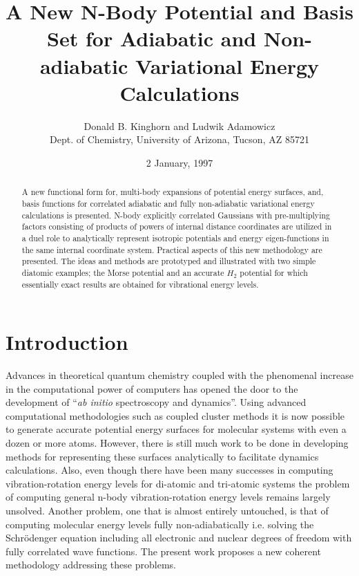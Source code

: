 \documentclass[12pt,thmsa]{article}
\begin{document}
\author{Donald B. Kinghorn and Ludwik Adamowicz \\
Dept. of Chemistry, University of Arizona, Tucson, AZ 85721}
\title{A New N-Body Potential and Basis Set for Adiabatic and Non-adiabatic
Variational Energy Calculations }
\date{2 January, 1997}
\maketitle

\begin{abstract}
A new functional form for, multi-body expansions of potential energy
surfaces, and, basis functions for correlated adiabatic and fully
non-adiabatic variational energy calculations is presented. N-body
explicitly correlated Gaussians with pre-multiplying factors consisting of
products of powers of internal distance coordinates are utilized in a duel
role to analytically represent isotropic potentials and energy
eigen-functions in the same internal coordinate system. Practical aspects of
this new methodology are presented. The ideas and methods are prototyped and
illustrated with two simple diatomic examples; the Morse potential and an
accurate $H_2$ potential for which essentially exact results are obtained
for vibrational energy levels.
\end{abstract}

\section{Introduction}

Advances in theoretical quantum chemistry coupled with the phenomenal
increase in the computational power of computers has opened the door to the
development of ``\emph{ab initio} spectroscopy and dynamics''. Using
advanced computational methodologies such as coupled cluster methods\cite
{Bartlett95} it is now possible to generate accurate potential energy
surfaces for molecular systems with even a dozen or more atoms. However,
there is still much work to be done in developing methods for representing
these surfaces analytically to facilitate dynamics calculations. Also, even
though there have been many successes in computing vibration-rotation energy
levels for di-atomic and tri-atomic systems the problem of computing general
n-body vibration-rotation energy levels remains largely unsolved. Another
problem, one that is almost entirely untouched, is that of computing
molecular energy levels fully non-adiabatically i.e. solving the
Schr\"{o}denger equation including all electronic and nuclear degrees of
freedom with fully correlated wave functions. The present work proposes a
new coherent methodology addressing these problems.
\end{document}
